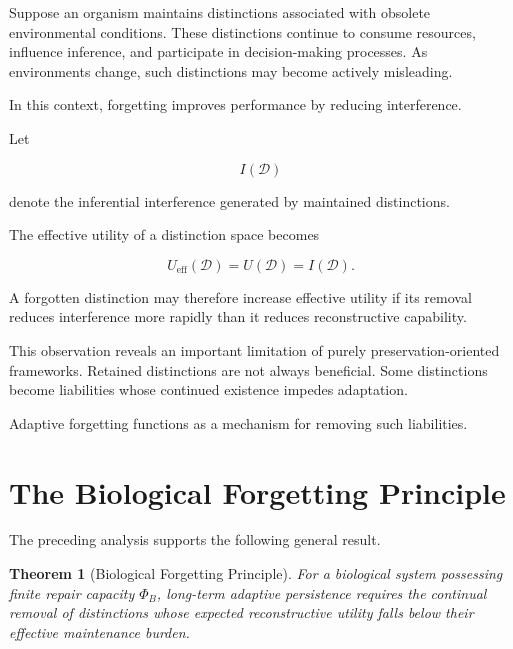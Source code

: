 \documentclass[12pt,oneside]{book}
\theoremstyle{plain} \newtheorem{theorem}{Theorem}[chapter] \newtheorem{lemma}[theorem]{Lemma} \newtheorem{proposition}[theorem]{Proposition} \newtheorem{corollary}[theorem]{Corollary}
\theoremstyle{definition} \newtheorem{definition}[theorem]{Definition} \newtheorem{axiom}[theorem]{Axiom} \newtheorem{construction}[theorem]{Construction}
\theoremstyle{remark} \newtheorem{remark}[theorem]{Remark} \newtheorem{example}[theorem]{Example}
\newcommand{\D}{\mathcal{D}} \newcommand{\R}{\mathcal{R}} \newcommand{\F}{\mathcal{F}} \newcommand{\U}{\mathcal{U}} \newcommand{\M}{\mathcal{M}} \newcommand{\G}{\Gamma}
\begin{document}
Suppose an organism maintains distinctions associated with obsolete environmental conditions. These distinctions continue to consume resources, influence inference, and participate in decision-making processes. As environments change, such distinctions may become actively misleading.

In this context, forgetting improves performance by reducing interference.

Let

\[
I(\D)
\]

denote the inferential interference generated by maintained distinctions.

The effective utility of a distinction space becomes

\[
U_{\mathrm{eff}}(\D)
=
U(\D)
=
I(\D).
\]

A forgotten distinction may therefore increase effective utility if its removal reduces interference more rapidly than it reduces reconstructive capability.

This observation reveals an important limitation of purely preservation-oriented frameworks. Retained distinctions are not always beneficial. Some distinctions become liabilities whose continued existence impedes adaptation.

Adaptive forgetting functions as a mechanism for removing such liabilities.

\section{The Biological Forgetting Principle}

The preceding analysis supports the following general result.

\begin{theorem}[Biological Forgetting Principle]

For a biological system possessing finite repair capacity $\Phi_B$, long-term adaptive persistence requires the continual removal of distinctions whose expected reconstructive utility falls below their effective maintenance burden.

\end{theorem}
\end{document}

